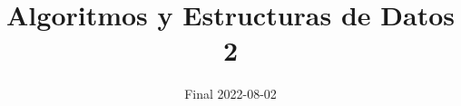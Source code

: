 

\title{Algoritmos y Estructuras de Datos 2}
\author{Final 2022-08-02}
\date{}



\maketitle








